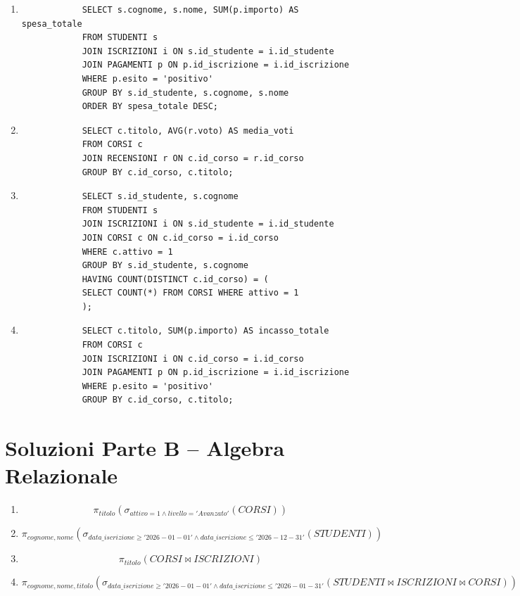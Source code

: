 \documentclass[a4paper,12pt]{article}
\begin{document}
\begin{enumerate}
		\item
		\begin{verbatim}
			SELECT s.cognome, s.nome, SUM(p.importo) AS spesa_totale
			FROM STUDENTI s
			JOIN ISCRIZIONI i ON s.id_studente = i.id_studente
			JOIN PAGAMENTI p ON p.id_iscrizione = i.id_iscrizione
			WHERE p.esito = 'positivo'
			GROUP BY s.id_studente, s.cognome, s.nome
			ORDER BY spesa_totale DESC;
		\end{verbatim}
		
		\item
		\begin{verbatim}
			SELECT c.titolo, AVG(r.voto) AS media_voti
			FROM CORSI c
			JOIN RECENSIONI r ON c.id_corso = r.id_corso
			GROUP BY c.id_corso, c.titolo;
		\end{verbatim}
		
		\item
		\begin{verbatim}
			SELECT s.id_studente, s.cognome
			FROM STUDENTI s
			JOIN ISCRIZIONI i ON s.id_studente = i.id_studente
			JOIN CORSI c ON c.id_corso = i.id_corso
			WHERE c.attivo = 1
			GROUP BY s.id_studente, s.cognome
			HAVING COUNT(DISTINCT c.id_corso) = (
			SELECT COUNT(*) FROM CORSI WHERE attivo = 1
			);
		\end{verbatim}
		
		\item
		\begin{verbatim}
			SELECT c.titolo, SUM(p.importo) AS incasso_totale
			FROM CORSI c
			JOIN ISCRIZIONI i ON c.id_corso = i.id_corso
			JOIN PAGAMENTI p ON p.id_iscrizione = i.id_iscrizione
			WHERE p.esito = 'positivo'
			GROUP BY c.id_corso, c.titolo;
		\end{verbatim}
		
	\end{enumerate}
	
	\section*{Soluzioni Parte B -- Algebra Relazionale}
	
	\begin{enumerate}
		
		\item
		\[
		\pi_{titolo}(\sigma_{attivo=1 \land livello='Avanzato'}(CORSI))
		\]
		
		\item
		\[
		\pi_{cognome, nome}(\sigma_{data\_iscrizione \geq '2026-01-01' \land data\_iscrizione \leq '2026-12-31'}(STUDENTI))
		\]
		
		\item
		\[
		\pi_{titolo}(CORSI \bowtie ISCRIZIONI)
		\]
		
		\item
		\[
		\pi_{cognome, nome, titolo}(
		\sigma_{data\_iscrizione \geq '2026-01-01' \land data\_iscrizione \leq '2026-01-31'}
		(STUDENTI \bowtie ISCRIZIONI \bowtie CORSI))
		\]
		
	\end{enumerate}
	
\end{document}
